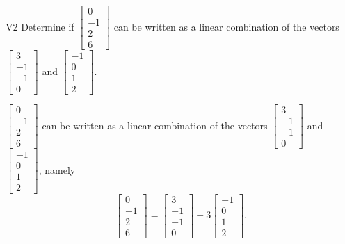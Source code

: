 \begin{problem}{V2}
Determine if \(\begin{bmatrix}0 \\ -1 \\ 2 \\ 6 \end{bmatrix}\) can be written as a linear combination of the vectors \(\begin{bmatrix} 3 \\ -1 \\ -1 \\ 0 \end{bmatrix}\) and \(\begin{bmatrix} -1 \\ 0 \\ 1 \\ 2 \end{bmatrix}\).
\end{problem}
\begin{solution}
\(\begin{bmatrix}0 \\ -1 \\ 2 \\ 6 \end{bmatrix}\) can be written as a linear combination of the vectors \(\begin{bmatrix} 3 \\ -1 \\ -1 \\ 0 \end{bmatrix}\) and \(\begin{bmatrix} -1 \\ 0 \\ 1 \\ 2 \end{bmatrix}\), namely
\[\begin{bmatrix}0 \\ -1 \\ 2 \\ 6 \end{bmatrix}=\begin{bmatrix} 3 \\ -1 \\ -1 \\ 0 \end{bmatrix}+3\begin{bmatrix} -1 \\ 0 \\ 1 \\ 2 \end{bmatrix}.\]
\end{solution}

